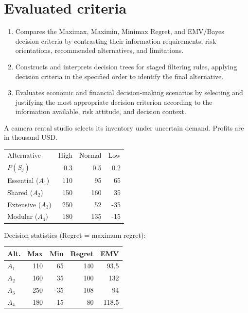 \section*{Evaluated criteria}
\begin{enumerate}[label=\textbf{C\arabic*},start=8]
\item Compares the Maximax, Maximin, Minimax Regret, and EMV/Bayes decision criteria by contrasting their information requirements, risk orientations, recommended alternatives, and limitations.
\item Constructs and interprets decision trees for staged filtering rules, applying decision criteria in the specified order to identify the final alternative.
\item Evaluates economic and financial decision-making scenarios by selecting and justifying the most appropriate decision criterion according to the information available, risk attitude, and decision context.
\end{enumerate}



A camera rental studio selects its inventory under uncertain demand. Profits are in thousand USD.

\vspace{-3mm}
\begin{center}\small\setlength{\tabcolsep}{4pt}
	\begin{tabular}{lrrr}\toprule
		Alternative & High & Normal & Low\\
		$P(S_j)$ & 0.3 & 0.5 & 0.2\\ \midrule
				Essential ($A_1$) & 110 & 95 & 65\\
		Shared ($A_2$) & 150 & 160 & 35\\
		Extensive ($A_3$) & 250 & 52 & -35\\
		Modular ($A_4$) & 180 & 135 & -15\\
		\bottomrule
	\end{tabular}
\end{center} \vspace*{-3mm}

Decision statistics (Regret = maximum regret):

\vspace{-3mm}
\begin{center}\small\setlength{\tabcolsep}{4pt}
	\begin{tabular}{lrrrr}\toprule
		Alt. & Max & Min & Regret & EMV\\ \midrule
				$A_1$ & 110 & 65 & 140 & 93.5\\
		$A_2$ & 160 & 35 & 100 & 132\\
		$A_3$ & 250 & -35 & 108 & 94\\
		$A_4$ & 180 & -15 & 80 & 118.5\\
		\bottomrule
	\end{tabular}
\end{center}
\vspace{-3mm}

